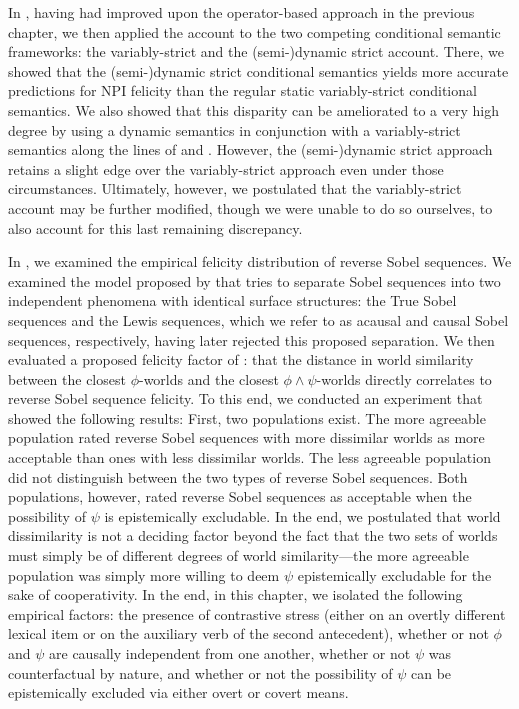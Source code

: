 In , having had improved upon the operator-based approach in the previous chapter, we then applied the account to the two competing conditional semantic frameworks: the variably-strict and the (semi-)dynamic strict account. There, we showed that the (semi-)dynamic strict conditional semantics yields more accurate predictions for NPI felicity than the regular static variably-strict conditional semantics. We also showed that this disparity can be ameliorated to a very high degree by using a dynamic semantics in conjunction with a variably-strict semantics along the lines of \parencite{vanRooij2006} and \parencite{Walker2015}. However, the (semi-)dynamic strict approach retains a slight edge over the variably-strict approach even under those circumstances. Ultimately, however, we postulated that the variably-strict account may be further modified, though we were unable to do so ourselves, to also account for this last remaining discrepancy.

In , we examined the empirical felicity distribution of reverse Sobel sequences. We examined the model proposed by \textcite{Klecha2014,Klecha2015} that tries to separate Sobel sequences into two independent phenomena with identical surface structures: the True Sobel sequences and the Lewis sequences, which we refer to as acausal and causal Sobel sequences, respectively, having later rejected this proposed separation. We then evaluated a proposed felicity factor of \textcite{Lewis2018}: that the distance in world similarity between the closest $\phi$-worlds and the closest $\phi\land\psi$-worlds directly correlates to reverse Sobel sequence felicity. To this end, we conducted an experiment that showed the following results: First, two populations exist. The more agreeable population rated reverse Sobel sequences with more dissimilar worlds as more acceptable than ones with less dissimilar worlds. The less agreeable population did not distinguish between the two types of reverse Sobel sequences. Both populations, however, rated reverse Sobel sequences as acceptable when the possibility of $\psi$ is epistemically excludable.  In the end, we postulated that world dissimilarity is not a deciding factor beyond the fact that the two sets of worlds must simply be of different degrees of world similarity---the more agreeable population was simply more willing to deem $\psi$ epistemically excludable for the sake of cooperativity. In the end, in this chapter, we isolated the following empirical factors: the presence of contrastive stress (either on an overtly different lexical item or on the auxiliary verb of the second antecedent), whether or not $\phi$ and $\psi$ are causally independent from one another, whether or not $\psi$ was counterfactual by nature, and whether or not the possibility of $\psi$ can be epistemically excluded via either overt or covert means.


